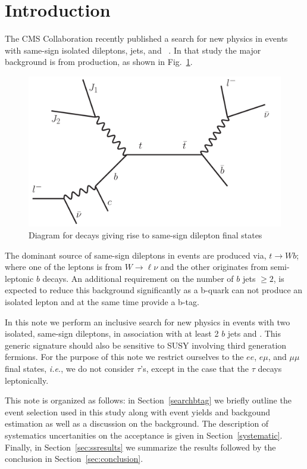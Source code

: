 \section{Introduction}
\label{sec:intro}
The CMS Collaboration recently published a search for new physics
in events with same-sign isolated dileptons, jets, and \met~\cite{sspaper}. In that study the major
background is from \ttbar production, as shown in Fig.~\ref{fig:ttbar}.

\begin{figure}[htb]
\begin{center}
\includegraphics[width=0.6\linewidth, height=0.35\linewidth]{figs/ttbar.pdf}
\caption{ Diagram for \ttbar decays giving rise to same-sign dilepton final states \label{fig:ttbar}}
\end{center}
\end{figure}

The dominant source of same-sign dileptons in \ttbar events are produced via, $t \rightarrow W b$; where 
one of the leptons is from $W \rightarrow \ell \nu $ and the other originates from semi-leptonic $b$ decays. 
An additional requirement on the number of $b$ jets $\geq 2$, is expected to reduce this background significantly
as a b-quark can not produce an isolated lepton and at the same time provide a b-tag.

In this note we perform an inclusive search for new physics  in events with two isolated, same-sign dileptons,
in association with at least 2 $b$ jets and \met. This generic signature should also be sensitive to SUSY involving
third generation fermions.  For the purpose of this note we restrict ourselves to the $ee$, $e\mu$, and $\mu\mu$ 
final states, {\em i.e.}, we do not consider $\tau$'s, except in the case that the $\tau$ decays leptonically.

This note is organized as follows: in Section~\ref{searchbtag} we briefly outline the event selection used in this study 
along with event yields and backgound estimation as well as a discussion on the background. The description of systematics uncertanities on the 
acceptance is given in Section~\ref{systematic}.  Finally, in Section~\ref{sec:ssresults} we summarize the results followed by 
the conclusion in Section~\ref{sec:conclusion}.




